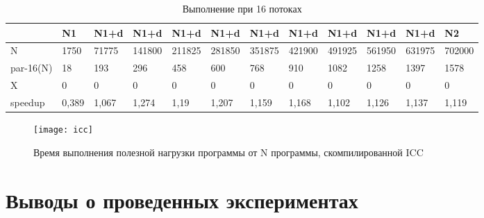 \documentclass[a4paper,14pt,russian]{extarticle}
\begin{document}
\begin{table}[H]
	\caption{Выполнение при 16 потоках}
	\label{icc-16}
	\begin{adjustbox}{width=\textwidth,nofloat=table}
		\begin{tabular}{|l|l|l|l|l|l|l|l|l|l|l|l|}
			\hline
			& N1   & N1+d  & N1+d   & N1+d   & N1+d   & N1+d   & N1+d   & N1+d   & N1+d   & N1+d   & N2     \\ \hline
N         & 1750  & 71775 & 141800 & 211825 & 281850 & 351875 & 421900 & 491925 & 561950 & 631975 & 702000 \\ \hline
par-16(N) & 18    & 193   & 296    & 458    & 600    & 768    & 910    & 1082   & 1258   & 1397   & 1578   \\ \hline
X         & 0     & 0     & 0      & 0      & 0      & 0      & 0      & 0      & 0      & 0      & 0      \\ \hline
speedup   & 0,389 & 1,067 & 1,274  & 1,19   & 1,207  & 1,159  & 1,168  & 1,102  & 1,126  & 1,137  & 1,119  \\ \hline
		\end{tabular}
	\end{adjustbox}
\end{table}

\begin{figure}[H]
	\centering
	\texttt{[image: icc]}
	\caption{Время выполнения полезной нагрузки программы от N программы, скомпилированной ICC}
	\label{pic:icc}
\end{figure}


\section{Выводы о проведенных экспериментах}
\end{document}
